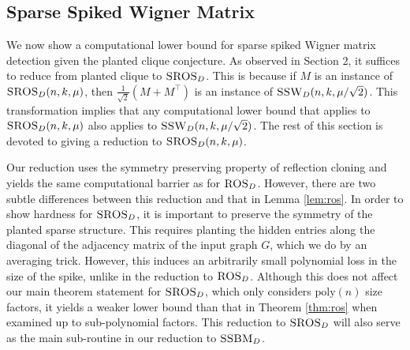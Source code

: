 \subsection{Sparse Spiked Wigner Matrix}


We now show a computational lower bound for sparse spiked Wigner matrix detection given the planted clique conjecture. As observed in Section 2, it suffices to reduce from planted clique to $\textsc{SROS}_D$. This is because if $M$ is an instance of $\textsc{SROS}_D(n, k, \mu)$, then $\frac{1}{\sqrt{2}} (M + M^\top)$ is an instance of $\textsc{SSW}_D(n, k, \mu/\sqrt{2})$. This transformation implies that any computational lower bound that applies to $\textsc{SROS}_D(n, k, \mu)$ also applies to $\textsc{SSW}_D(n, k, \mu/\sqrt{2})$. The rest of this section is devoted to giving a reduction to $\textsc{SROS}_D(n, k, \mu)$.

Our reduction uses the symmetry preserving property of reflection cloning and yields the same computational barrier as for $\textsc{ROS}_D$. However, there are two subtle differences between this reduction and that in Lemma \ref{lem:ros}. In order to show hardness for $\textsc{SROS}_D$, it is important to preserve the symmetry of the planted sparse structure. This requires planting the hidden entries along the diagonal of the adjacency matrix of the input graph $G$, which we do by an averaging trick. However, this induces an arbitrarily small polynomial loss in the size of the spike, unlike in the reduction to $\textsc{ROS}_D$. Although this does not affect our main theorem statement for $\textsc{SROS}_D$, which only considers $\text{poly}(n)$ size factors, it yields a weaker lower bound than that in Theorem \ref{thm:ros} when examined up to sub-polynomial factors. This reduction to $\textsc{SROS}_D$ will also serve as the main sub-routine in our reduction to $\textsc{SSBM}_D$.

